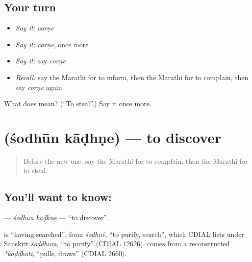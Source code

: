 \subsection*{Your turn}
\begin{itemize}
\raggedright
  \item \emph{Say it:} \emph{corṇe}
  \item \emph{Say it:} \emph{corṇe}, once more
  \item \emph{Say it:} say \emph{corṇe}
  \item \emph{Recall:} say the Marathi for to inform, then the Marathi for to complain, then say \emph{corṇe} again
\end{itemize}

\begin{tcolorbox}[breakable,colback=teal!4,colframe=teal!35!black,title={Before you move on}]
What does  mean? (\textquotedblleft{}To steal\textquotedblright{}.) Say it once more.
\end{tcolorbox}
\section[\texorpdfstring{\mr{शोधून} \mr{काढणे} (śodhūn kāḍhṇe)}{शोधून काढणे (śodhūn kāḍhṇe)}]{  (śodhūn kāḍhṇe) — to discover}

\label{lesson:MR-C254-sodhun-kadhne}



\begin{quote}
Before the new one: say the Marathi for to complain, then the Marathi for to steal.
\end{quote}

\subsection*{You'll want to know:  }
\textbf{ } — \emph{śodhūn kāḍhṇe} — \textquotedblleft{}to discover\textquotedblright{}.

\begin{cousinweb}
\textbf{} is \textquotedblleft{}having searched\textquotedblright{}, from \emph{śodhṇẽ}, \textquotedblleft{}to purify, search\textquotedblright{}, which CDIAL lists under Sanskrit \emph{śoddhum}, \textquotedblleft{}to purify\textquotedblright{} (CDIAL 12626). \textbf{} comes from a reconstructed \emph{*kaḍḍhati}, \textquotedblleft{}pulls, draws\textquotedblright{} (CDIAL 2660).
\end{cousinweb}

